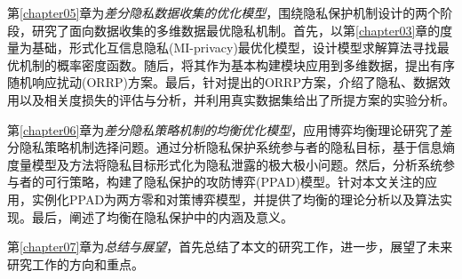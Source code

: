 第\ref{chapter05}章为{\em 差分隐私数据收集的优化模型}，围绕隐私保护机制设计的两个阶段，研究了面向数据收集的多维数据最优隐私机制。首先，以第\ref{chapter03}章的度量为基础，形式化互信息隐私(MI-privacy)最优化模型，设计模型求解算法寻找最优机制的概率密度函数。随后，将其作为基本构建模块应用到多维数据，提出有序随机响应扰动(ORRP)方案。最后，针对提出的ORRP方案，介绍了隐私、数据效用以及相关度损失的评估与分析，并利用真实数据集给出了所提方案的实验分析。


第\ref{chapter06}章为{\em 差分隐私策略机制的均衡优化模型}，应用博弈均衡理论研究了差分隐私策略机制选择问题。通过分析隐私保护系统参与者的隐私目标，基于信息熵度量模型及方法将隐私目标形式化为隐私泄露的极大极小问题。然后，分析系统参与者的可行策略，构建了隐私保护的攻防博弈(PPAD)模型。针对本文关注的应用，实例化PPAD为两方零和对策博弈模型，并提供了均衡的理论分析以及算法实现。最后，阐述了均衡在隐私保护中的内涵及意义。


第\ref{chapter07}章为\textit{总结与展望}，首先总结了本文的研究工作，进一步，展望了未来研究工作的方向和重点。


